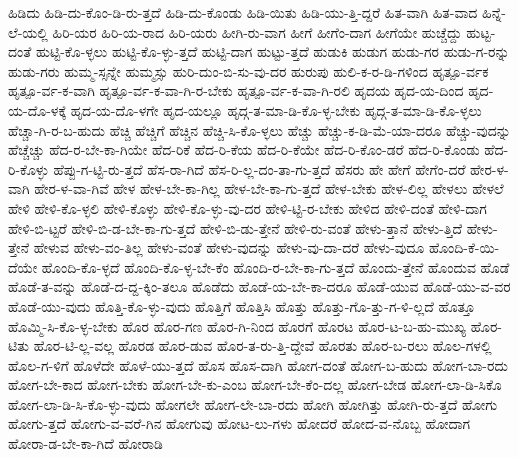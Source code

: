 {ಹಿಡಿದು
ಹಿಡಿ-ದು-ಕೊಂ-ಡಿ-ರು-ತ್ತದೆ
ಹಿಡಿ-ದು-ಕೊಂಡು
ಹಿಡಿ-ಯಿತು
ಹಿಡಿ-ಯು-ತ್ತಿ-ದ್ದರೆ
ಹಿತ-ವಾಗಿ
ಹಿತ-ವಾದ
ಹಿನ್ನೆ-ಲೆ-ಯಲ್ಲಿ
ಹಿರಿ-ಯರ
ಹಿರಿ-ಯ-ರಾದ
ಹಿರಿ-ಯರು
ಹೀಗಿ-ರು-ವಾಗ
ಹೀಗೆ
ಹೀಗೆಂ-ದಾಗ
ಹೀಗೆಯೇ
ಹುಚ್ಚೆದ್ದು
ಹುಟ್ಟ-ದಂತೆ
ಹುಟ್ಟಿ-ಕೊ-ಳ್ಳಲು
ಹುಟ್ಟಿ-ಕೊ-ಳ್ಳು-ತ್ತದೆ
ಹುಟ್ಟಿ-ದಾಗ
ಹುಟ್ಟು-ತ್ತದೆ
ಹುಡುಕಿ
ಹುಡುಗ
ಹುಡು-ಗರ
ಹುಡು-ಗ-ರನ್ನು
ಹುಡು-ಗರು
ಹುಮ್ಮ-ಸ್ಸನ್ನೇ
ಹುಮ್ಮಸ್ಸು
ಹುರಿ-ದುಂ-ಬಿ-ಸು-ವು-ದರ
ಹುರುಪು
ಹುಲಿ-ಕ-ರ-ಡಿ-ಗಳಿಂದ
ಹೃತ್ಪೂ-ರ್ವಕ
ಹೃತ್ಪೂ-ರ್ವ-ಕ-ವಾಗಿ
ಹೃತ್ಪೂ-ರ್ವ-ಕ-ವಾ-ಗಿ-ರ-ಬೇಕು
ಹೃತ್ಪೂ-ರ್ವ-ಕ-ವಾ-ಗಿ-ರಲಿ
ಹೃದಯ
ಹೃದ-ಯ-ದಿಂದ
ಹೃದ-ಯ-ದೊ-ಳಕ್ಕೆ
ಹೃದ-ಯ-ದೊ-ಳಗೇ
ಹೃದ-ಯಲ್ಲೂ
ಹೃದ್ಗ-ತ-ಮಾ-ಡಿ-ಕೊ-ಳ್ಳ-ಬೇಕು
ಹೃದ್ಗ-ತ-ಮಾ-ಡಿ-ಕೊ-ಳ್ಳಲು
ಹೆಚ್ಚಾ-ಗಿ-ರ-ಬ-ಹುದು
ಹೆಚ್ಚಿ
ಹೆಚ್ಚಿಗೆ
ಹೆಚ್ಚಿನ
ಹೆಚ್ಚಿ-ಸಿ-ಕೊ-ಳ್ಳಲು
ಹೆಚ್ಚು
ಹೆಚ್ಚು-ಕ-ಡಿ-ಮೆ-ಯಾ-ದರೂ
ಹೆಚ್ಚು-ವುದನ್ನು
ಹೆಚ್ಚೆಚ್ಚು
ಹೆದ-ರ-ಬೇ-ಕಾ-ಗಿಯೇ
ಹೆದ-ರಿಕೆ
ಹೆದ-ರಿ-ಕೆಯ
ಹೆದ-ರಿ-ಕೆಯೇ
ಹೆದ-ರಿ-ಕೊಂ-ಡರೆ
ಹೆದ-ರಿ-ಕೊಂಡು
ಹೆದ-ರಿ-ಕೊಳ್ಳು
ಹೆಪ್ಪು-ಗ-ಟ್ಟಿ-ರು-ತ್ತದೆ
ಹೆಸ-ರಾ-ಗಿದೆ
ಹೆಸ-ರಿ-ಲ್ಲ-ದಂ-ತಾ-ಗು-ತ್ತದೆ
ಹೆಸರು
ಹೇ
ಹೇಗೆ
ಹೇಗೆಂ-ದರೆ
ಹೇರ-ಳ-ವಾಗಿ
ಹೇರ-ಳ-ವಾ-ಗಿವೆ
ಹೇಳ
ಹೇಳ-ಬೇ-ಕಾ-ಗಿಲ್ಲ
ಹೇಳ-ಬೇ-ಕಾ-ಗು-ತ್ತದೆ
ಹೇಳ-ಬೇಕು
ಹೇಳ-ಲಿಲ್ಲ
ಹೇಳಲು
ಹೇಳಲೆ
ಹೇಳಿ
ಹೇಳಿ-ಕೊ-ಳ್ಳಲಿ
ಹೇಳಿ-ಕೊಳ್ಳು
ಹೇಳಿ-ಕೊ-ಳ್ಳು-ವು-ದರ
ಹೇಳಿ-ಟ್ಟಿ-ರ-ಬೇಕು
ಹೇಳಿದ
ಹೇಳಿ-ದಂತೆ
ಹೇಳಿ-ದಾಗ
ಹೇಳಿ-ಬಿ-ಟ್ಟರೆ
ಹೇಳಿ-ಬಿ-ಡ-ಬೇ-ಕಾ-ಗು-ತ್ತದೆ
ಹೇಳಿ-ಬಿ-ಡು-ತ್ತೇನೆ
ಹೇಳಿ-ರು-ವಂತೆ
ಹೇಳು-ತ್ತಾನೆ
ಹೇಳು-ತ್ತಿದೆ
ಹೇಳು-ತ್ತೇನೆ
ಹೇಳುವ
ಹೇಳು-ವಂ-ತಿಲ್ಲ
ಹೇಳು-ವಂತೆ
ಹೇಳು-ವುದನ್ನು
ಹೇಳು-ವು-ದಾ-ದರೆ
ಹೇಳು-ವುದೂ
ಹೊಂದಿ-ಕೆ-ಯಿ-ದೆಯೇ
ಹೊಂದಿ-ಕೊ-ಳ್ಳದೆ
ಹೊಂದಿ-ಕೊ-ಳ್ಳ-ಬೇ-ಕೆಂ
ಹೊಂದಿ-ರ-ಬೇ-ಕಾ-ಗು-ತ್ತದೆ
ಹೊಂದು-ತ್ತೇನೆ
ಹೊಂದುವ
ಹೊಡೆ
ಹೊಡೆ-ತ-ವನ್ನು
ಹೊಡೆ-ದ-ದ್ದ-ಕ್ಕಿಂ-ತಲೂ
ಹೊಡೆದು
ಹೊಡೆ-ಯ-ಬೇ-ಕಾ-ದರೂ
ಹೊಡೆ-ಯುವ
ಹೊಡೆ-ಯು-ವ-ವರ
ಹೊಡೆ-ಯು-ವುದು
ಹೊತ್ತಿ-ಕೊ-ಳ್ಳು-ವುದು
ಹೊತ್ತಿಗೆ
ಹೊತ್ತಿಸಿ
ಹೊತ್ತು
ಹೊತ್ತು-ಗೊ-ತ್ತು-ಗ-ಳಿ-ಲ್ಲದೆ
ಹೊತ್ತೂ
ಹೊಮ್ಮಿ-ಸಿ-ಕೊ-ಳ್ಳ-ಬೇಕು
ಹೊರ
ಹೊರ-ಗಣ
ಹೊರ-ಗಿ-ನಿಂದ
ಹೊರಗೆ
ಹೊರಟ
ಹೊರ-ಟ-ಬ-ಹು-ಮುಖ್ಯ
ಹೊರ-ಟಿತು
ಹೊರ-ಟಿ-ಲ್ಲ-ವಲ್ಲ
ಹೊರಡ
ಹೊರ-ಡುವ
ಹೊರ-ತ-ರು-ತ್ತಿ-ದ್ದೇವೆ
ಹೊರತು
ಹೊರ-ಬ-ರಲು
ಹೊಲ-ಗಳಲ್ಲಿ
ಹೊಲ-ಗ-ಳಿಗೆ
ಹೊಳೆದೇ
ಹೊಳೆ-ಯು-ತ್ತದೆ
ಹೊಸ
ಹೊಸ-ದಾಗಿ
ಹೋಗ-ದಂತೆ
ಹೋಗ-ಬ-ಹುದು
ಹೋಗ-ಬಾ-ರದು
ಹೋಗ-ಬೇ-ಕಾದ
ಹೋಗ-ಬೇಕು
ಹೋಗ-ಬೇ-ಕು-ಎಂಬ
ಹೋಗ-ಬೇ-ಕೆಂ-ದಲ್ಲ
ಹೋಗ-ಬೇಡ
ಹೋಗ-ಲಾ-ಡಿ-ಸಿಕೊ
ಹೋಗ-ಲಾ-ಡಿ-ಸಿ-ಕೊ-ಳ್ಳು-ವುದು
ಹೋಗಲೇ
ಹೋಗ-ಲೇ-ಬಾ-ರದು
ಹೋಗಿ
ಹೋಗಿತ್ತು
ಹೋಗಿ-ರು-ತ್ತದೆ
ಹೋಗು
ಹೋಗು-ತ್ತದೆ
ಹೋಗು-ವ-ವರೆ-ಗಿನ
ಹೋಗುವು
ಹೋಟ-ಲು-ಗಳು
ಹೋದರೆ
ಹೋದ-ವ-ನೊಬ್ಬ
ಹೋದಾಗ
ಹೋರಾ-ಡ-ಬೇ-ಕಾ-ಗಿದೆ
ಹೋರಾಡಿ
}
